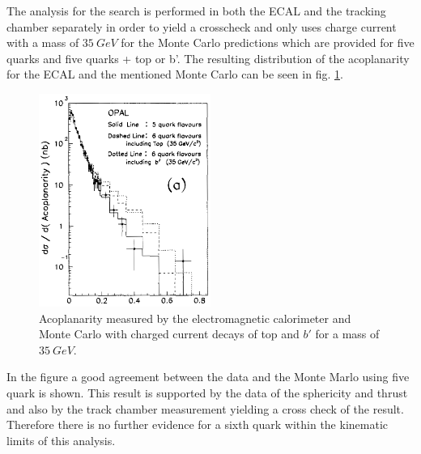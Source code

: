 \documentclass[11pt, twocolumn, a4paper]{article}
\begin{document}
The analysis for the search is performed in both the ECAL and the tracking chamber separately in order to yield a crosscheck and only uses charge current with a mass of $\SI{35}{GeV}$ for the Monte Carlo predictions which are provided for five quarks and five quarks + top or b'.
The resulting distribution of the acoplanarity for the ECAL and the mentioned Monte Carlo can be seen in fig. \ref{fig:aco}.
\begin{figure}
	\centering
	\includegraphics[width=0.5\textwidth]{plot.png}
	\caption{Acoplanarity measured by the electromagnetic calorimeter and Monte Carlo with charged current decays of top and $b'$ for a mass of $\SI{35}{GeV}$.\cite{paper}}
	\label{fig:aco}
\end{figure}
In the figure a good agreement between the data and the Monte Marlo using five quark is shown.
This result is supported by the data of the sphericity and thrust and also by the track chamber measurement yielding a cross check of the result.
Therefore there is no further evidence for a sixth quark within the kinematic limits of this analysis.\\
\end{document}
